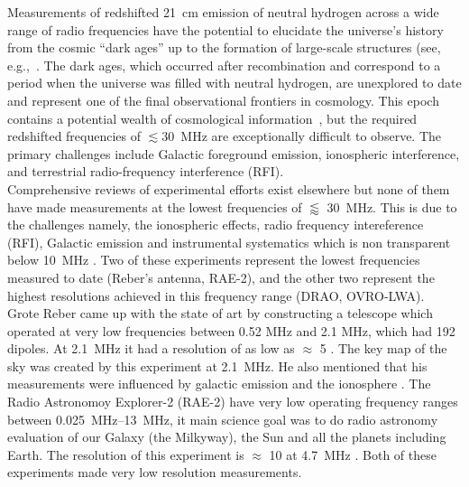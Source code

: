 \documentclass{ws-jai}
\begin{document}
Measurements of redshifted \SI{21}{\cm} emission of neutral hydrogen
across a wide range of radio frequencies have the potential to
elucidate the universe's history from the cosmic ``dark ages'' up to
the formation of large-scale structures (see,
e.g.,~\citep{ska_physics,2013PhRvD..87d3002L,2014ApJ...782...66P}.
The dark ages, which occurred after recombination and correspond to a
period when the universe was filled with neutral hydrogen, are
unexplored to date and represent one of the final observational
frontiers in cosmology.  This epoch contains a potential wealth of
cosmological information~\citep{loeb_zaldarriaga}, but the required
redshifted frequencies of $\lesssim 30$~MHz are exceptionally
difficult to observe.  The primary challenges include Galactic
foreground emission, ionospheric interference, and terrestrial
radio-frequency interference (RFI). \\


Comprehensive reviews of experimental efforts exist elsewhere but none of them have made measurements at the lowest frequencies of $\lessapprox$ \SI{30}{\MHz}. This is due to the challenges namely, the ionospheric effects, radio frequency intereference (RFI), Galactic emission and instrumental systematics which is non transparent below \SI{10}{\MHz} \cite{2019JAI.....850004P}. Two of these experiments represent the lowest frequencies measured to date (Reber’s antenna, RAE-2), and the other two represent the highest resolutions achieved in this frequency range (DRAO, OVRO-LWA).\\

Grote Reber came up with the state of art by constructing a telescope which operated at very low frequencies between 0.52 MHz and 2.1 MHz, which had 192 dipoles. At \SI{2.1}{\MHz} it had a resolution of as low as $\approx$ 5 \degree. The key map of the sky was created by this experiment at \SI{2.1}{\MHz}. He also mentioned that his measurements were influenced by galactic emission and the ionosphere \cite{article, 1988A&A...195..372W}. The Radio Astronomoy Explorer-2 (RAE-2) have very low operating frequency ranges between \SIrange{0.025}{13}{\MHz}, it main science goal was to do radio astronomy evaluation of our Galaxy (the Milkyway), the Sun and all the planets including Earth. The resolution of this experiment is $\approx$ 10 \degree at \SI{4.7}{\MHz} \cite{1975A&A....40..365A}. Both of these experiments made very low resolution measurements.\\
\end{document}
